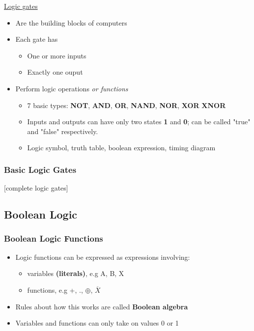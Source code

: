 \documentclass{article}
\begin{document}
\underline{Logic gates}
\begin{itemize}
\item Are the building blocks of computers
\item Each gate has
\begin{itemize}
\item One or more inputs
\item Exactly one ouput
\end{itemize}
\item Perform logic operations \textit{or functions}
\begin{itemize}
\item 7 basic types: \textbf{NOT}, \textbf{AND}, \textbf{OR}, \textbf{NAND}, \textbf{NOR}, \textbf{XOR}
\textbf{XNOR}
\item Inputs and outputs can have only two states \textbf{1} and \textbf{0}; can be called "true" and "false"
respectively.
\item Logic symbol, truth table, boolean expression, timing diagram
\end{itemize}
\end{itemize}

\subsubsection{Basic Logic Gates}

[complete logic gates]

\subsection{Boolean Logic}
\subsubsection{Boolean Logic Functions}
\begin{itemize}
\item Logic functions can be expressed as expressions involving:
\begin{itemize}
\item variables \textbf{(literals)}, e.g A, B, X
\item functions, e.g +, ., $\oplus$, $\overline{X}$
\end{itemize}
\item Rules about how this works are called \textbf{Boolean algebra}
\item Variables and functions can only take on values 0 or 1
\end{itemize}
\end{document}
